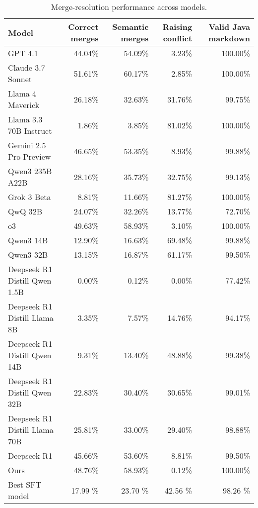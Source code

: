 \begin{table}[ht]
\centering
\begin{tabular}{lrrrr}
\toprule
Model & Correct merges & Semantic merges & Raising conflict & Valid Java markdown \\
\midrule
GPT 4.1 & 44.04\% & 54.09\% & 3.23\% & 100.00\% \\
Claude 3.7 Sonnet & 51.61\% & 60.17\% & 2.85\% & 100.00\% \\
Llama 4 Maverick & 26.18\% & 32.63\% & 31.76\% & 99.75\% \\
Llama 3.3 70B Instruct & 1.86\% & 3.85\% & 81.02\% & 100.00\% \\
Gemini 2.5 Pro Preview & 46.65\% & 53.35\% & 8.93\% & 99.88\% \\
Qwen3 235B A22B & 28.16\% & 35.73\% & 32.75\% & 99.13\% \\
Grok 3 Beta & 8.81\% & 11.66\% & 81.27\% & 100.00\% \\
QwQ 32B & 24.07\% & 32.26\% & 13.77\% & 72.70\% \\
o3 & 49.63\% & 58.93\% & 3.10\% & 100.00\% \\
Qwen3 14B & 12.90\% & 16.63\% & 69.48\% & 99.88\% \\
Qwen3 32B & 13.15\% & 16.87\% & 61.17\% & 99.50\% \\
Deepseek R1 Distill Qwen 1.5B & 0.00\% & 0.12\% & 0.00\% & 77.42\% \\
Deepseek R1 Distill Llama 8B & 3.35\% & 7.57\% & 14.76\% & 94.17\% \\
Deepseek R1 Distill Qwen 14B & 9.31\% & 13.40\% & 48.88\% & 99.38\% \\
Deepseek R1 Distill Qwen 32B & 22.83\% & 30.40\% & 30.65\% & 99.01\% \\
Deepseek R1 Distill Llama 70B & 25.81\% & 33.00\% & 29.40\% & 98.88\% \\
Deepseek R1 & 45.66\% & 53.60\% & 8.81\% & 99.50\% \\
Ours & 48.76\% & 58.93\% & 0.12\% & 100.00\% \\
Best SFT model &  17.99 \% &  23.70 \% &  42.56 \% &  98.26 \% \\
\bottomrule
\end{tabular}
\caption{Merge-resolution performance across models.}
\end{table}
